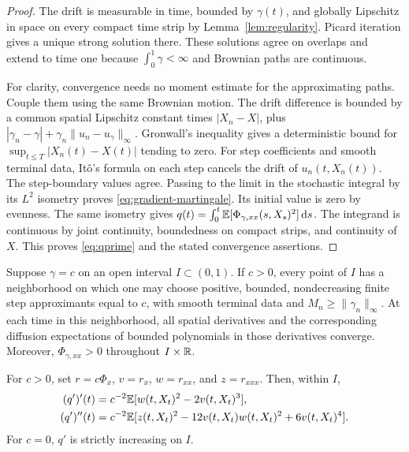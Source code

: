 \begin{proof}
The drift is measurable in time, bounded by $\gamma(t)$, and globally
Lipschitz in space on every compact time strip by
Lemma~\ref{lem:regularity}.  Picard iteration gives a unique strong
solution there.  These solutions agree on overlaps and extend to
time one because $\int_0^1\gamma<\infty$ and Brownian paths are
continuous.

For clarity, convergence needs no moment estimate for the
approximating paths.  Couple them using the same Brownian motion.
The drift difference is bounded by a common spatial Lipschitz
constant times $|X_n-X|$, plus
$|\gamma_n-\gamma|+\gamma_n\|u_n-u_\gamma\|_\infty$.
Gronwall's inequality gives a deterministic bound for
$\sup_{t\leq T}|X_n(t)-X(t)|$ tending to zero.  For step coefficients
and smooth terminal data, It\^o's formula on each step cancels the
drift of $u_n(t,X_n(t))$.  The step-boundary values agree.  Passing to
the limit in the stochastic integral by its $L^2$ isometry proves
\eqref{eq:gradient-martingale}.  Its initial value is zero by evenness.
The same isometry gives
$q(t)=\int_0^t\mathbb E[\Phi_{\gamma,xx}(s,X_s)^2]\,\mathrm d s$.
The integrand is continuous by joint continuity, boundedness on
compact strips, and continuity of $X$.  This proves
\eqref{eq:qprime} and the stated convergence assertions.
\end{proof}

\begin{lemma}
\label{lem:constant-transfer}
Suppose $\gamma=c$ on an open interval $I\subset(0,1)$.
If $c>0$, every point of $I$ has a neighborhood on which one may
choose positive, bounded, nondecreasing finite step approximants
equal to $c$, with smooth terminal data and
$M_n\geq\|\gamma_n\|_\infty$.  At each time in this neighborhood,
all spatial derivatives and the corresponding diffusion
expectations of bounded polynomials in those derivatives converge.
Moreover, $\Phi_{\gamma,xx}>0$ throughout $I\times\mathbb R$.

For $c>0$, set $r=c\Phi_x$, $v=r_x$, $w=r_{xx}$, and $z=r_{xxx}$.
Then, within $I$,
\begin{align}
 (q')'(t)&=c^{-2}\mathbb E[w(t,X_t)^2-2v(t,X_t)^3],
 \label{eq:first-curvature}\\
 (q')''(t)&=c^{-2}\mathbb E[z(t,X_t)^2-12v(t,X_t)w(t,X_t)^2
                                      +6v(t,X_t)^4].
 \label{eq:second-curvature}
\end{align}
For $c=0$, $q'$ is strictly increasing on $I$.
\end{lemma}

